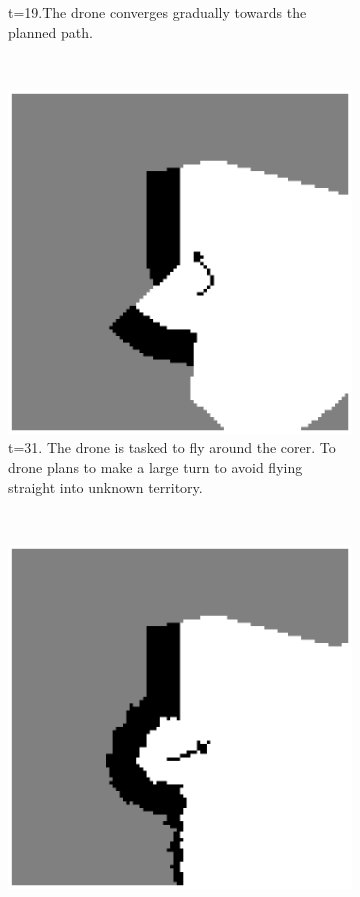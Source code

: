 \begin{figure}
\begin{subfigure}[t]{0.3\textwidth}
\caption{t=19.The drone converges gradually towards the planned path.}
\label{fig:sim_t19}
\end{subfigure}
\,
\begin{subfigure}[t]{0.3\textwidth}
\includegraphics[width=\textwidth]{Figures/Simulation/t31_before_turn.eps}
\caption{t=31. The drone is tasked to fly around the corer. To drone plans to make a large turn to avoid flying straight into unknown territory. }
\label{fig:sim_t31}
\end{subfigure}\\
\begin{subfigure}[t]{0.3\textwidth}
\includegraphics[width=\textwidth]{Figures/Simulation/t45.eps}

\end{subfigure}
\end{figure}
